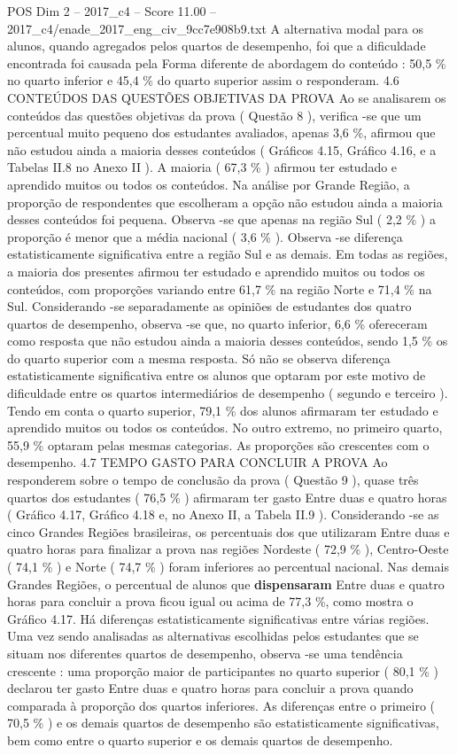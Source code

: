 \begin{textsample}{POS Dim 2 – 2017\_c4 – Score 11.00 – 2017\_c4/enade\_2017\_eng\_civ\_9cc7e908b9.txt}
A alternativa modal para os alunos, quando agregados pelos quartos de desempenho, foi que a dificuldade encontrada foi causada pela Forma diferente de abordagem do conteúdo : 50,5 \% no quarto inferior e 45,4 \% do quarto superior assim o responderam. 4.6 CONTEÚDOS DAS QUESTÕES OBJETIVAS DA PROVA Ao se analisarem os conteúdos das questões objetivas da prova ( Questão 8 ), verifica -se que um percentual muito pequeno dos estudantes avaliados, apenas 3,6 \%, afirmou que não estudou ainda a maioria desses conteúdos ( Gráficos 4.15, Gráfico 4.16, e a Tabelas II.8 no Anexo II ).
A maioria ( 67,3 \% ) afirmou ter estudado e aprendido muitos ou todos os conteúdos.
Na análise por Grande Região, a proporção de respondentes que escolheram a opção não estudou ainda a maioria desses conteúdos foi pequena.
Observa -se que apenas na região Sul ( 2,2 \% ) a proporção é menor que a média nacional ( 3,6 \% ).
Observa -se diferença estatisticamente significativa entre a região Sul e as demais.
Em todas as regiões, a maioria dos presentes afirmou ter estudado e aprendido muitos ou todos os conteúdos, com proporções variando entre 61,7 \% na região Norte e 71,4 \% na Sul.
Considerando -se separadamente as opiniões de estudantes dos quatro quartos de desempenho, observa -se que, no quarto inferior, 6,6 \% ofereceram como resposta que não estudou ainda a maioria desses conteúdos, sendo 1,5 \% os do quarto superior com a mesma resposta.
Só não se observa diferença estatisticamente significativa entre os alunos que optaram por este motivo de dificuldade entre os quartos intermediários de desempenho ( segundo e terceiro ).
Tendo em conta o quarto superior, 79,1 \% dos alunos afirmaram ter estudado e aprendido muitos ou todos os conteúdos.
No outro extremo, no primeiro quarto, 55,9 \% optaram pelas mesmas categorias.
As proporções são crescentes com o desempenho. 4.7 TEMPO GASTO PARA CONCLUIR A PROVA Ao responderem sobre o tempo de conclusão da prova ( Questão 9 ), quase três quartos dos estudantes ( 76,5 \% ) afirmaram ter gasto Entre duas e quatro horas ( Gráfico 4.17, Gráfico 4.18 e, no Anexo II, a Tabela II.9 ).
Considerando -se as cinco Grandes Regiões brasileiras, os percentuais dos que utilizaram Entre duas e quatro horas para finalizar a prova nas regiões Nordeste ( 72,9 \% ), Centro-Oeste ( 74,1 \% ) e Norte ( 74,7 \% ) foram inferiores ao percentual nacional.
Nas demais Grandes Regiões, o percentual de alunos que \textbf{dispensaram} Entre duas e quatro horas para concluir a prova ficou igual ou acima de 77,3 \%, como mostra o Gráfico 4.17.
Há diferenças estatisticamente significativas entre várias regiões.
Uma vez sendo analisadas as alternativas escolhidas pelos estudantes que se situam nos diferentes quartos de desempenho, observa -se uma tendência crescente : uma proporção maior de participantes no quarto superior ( 80,1 \% ) declarou ter gasto Entre duas e quatro horas para concluir a prova quando comparada à proporção dos quartos inferiores.
As diferenças entre o primeiro ( 70,5 \% ) e os demais quartos de desempenho são estatisticamente significativas, bem como entre o quarto superior e os demais quartos de desempenho.


\end{textsample}
